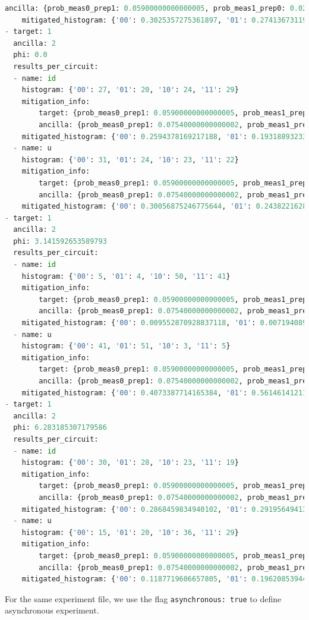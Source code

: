 \documentclass[preprint,12pt, a4paper, dvipsnames]{elsarticle}
\newcommand{\1}{{\rm 1\hspace{-0.9mm}l}}
\theoremstyle{definition}
\begin{document}
\begin{lstlisting}[language=Python, caption=Results (synchronous)]
		ancilla: {prob_meas0_prep1: 0.05900000000000005, prob_meas1_prep0: 0.0202}
	mitigated_histogram: {'00': 0.3025357275361897, '01': 0.27413673119534815, '10': 0.24313373302688793, '11': 0.18019380824157433}
- target: 1
  ancilla: 2
  phi: 0.0
  results_per_circuit:
  - name: id
	histogram: {'00': 27, '01': 20, '10': 24, '11': 29}
	mitigation_info:
		target: {prob_meas0_prep1: 0.05900000000000005, prob_meas1_prep0: 0.0202}
		ancilla: {prob_meas0_prep1: 0.07540000000000002, prob_meas1_prep0: 0.0528}
	mitigated_histogram: {'00': 0.2594378169217188, '01': 0.19318893233269735, '10': 0.23035366874292057, '11': 0.3170195820026633}
  - name: u
	histogram: {'00': 31, '01': 24, '10': 23, '11': 22}
	mitigation_info:
		target: {prob_meas0_prep1: 0.05900000000000005, prob_meas1_prep0: 0.0202}
		ancilla: {prob_meas0_prep1: 0.07540000000000002, prob_meas1_prep0: 0.0528}
	mitigated_histogram: {'00': 0.30056875246775644, '01': 0.2438221628798003, '10': 0.22180309809696985, '11': 0.23380598655547338}
- target: 1
  ancilla: 2
  phi: 3.141592653589793
  results_per_circuit:
  - name: id
	histogram: {'00': 5, '01': 4, '10': 50, '11': 41}
	mitigation_info:
		target: {prob_meas0_prep1: 0.05900000000000005, prob_meas1_prep0: 0.0202}
		ancilla: {prob_meas0_prep1: 0.07540000000000002, prob_meas1_prep0: 0.0528}
	mitigated_histogram: {'00': 0.009552870928837118, '01': 0.007194089383161034, '10': 0.5236791012692514, '11': 0.4595739384187503}
  - name: u
	histogram: {'00': 41, '01': 51, '10': 3, '11': 5}
	mitigation_info:
		target: {prob_meas0_prep1: 0.05900000000000005, prob_meas1_prep0: 0.0202}
		ancilla: {prob_meas0_prep1: 0.07540000000000002, prob_meas1_prep0: 0.0528}
	mitigated_histogram: {'00': 0.4073387714165384, '01': 0.5614614121117936, '10': 0.006431862814564833, '11': 0.024767953657102992}
- target: 1
  ancilla: 2
  phi: 6.283185307179586
  results_per_circuit:
  - name: id
	histogram: {'00': 30, '01': 28, '10': 23, '11': 19}
	mitigation_info:
		target: {prob_meas0_prep1: 0.05900000000000005, prob_meas1_prep0: 0.0202}
		ancilla: {prob_meas0_prep1: 0.07540000000000002, prob_meas1_prep0: 0.0528}
	mitigated_histogram: {'00': 0.2868459834940102, '01': 0.2919564941384742, '10': 0.22466574543735374, '11': 0.19653177693016174}
  - name: u
	histogram: {'00': 15, '01': 20, '10': 36, '11': 29}
	mitigation_info:
		target: {prob_meas0_prep1: 0.05900000000000005, prob_meas1_prep0: 0.0202}
		ancilla: {prob_meas0_prep1: 0.07540000000000002, prob_meas1_prep0: 0.0528}
	mitigated_histogram: {'00': 0.1187719606657805, '01': 0.1962085394489247, '10': 0.3710195249988589, '11': 0.31399997488643583}
\end{lstlisting}
For the same experiment file, we use the flag \texttt{asynchronous: true} to define asynchronous experiment.
\end{document}
